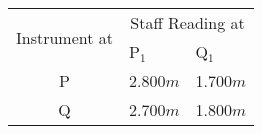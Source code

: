 \begin{tabular}{|c|p{3cm}|p{3cm}|}
    \hline
    \multirow{2}{*}{Instrument at} & \multicolumn{2}{|c|}{Staff Reading at}\\
    \cline{2-3}
    & P$_1$ & Q$_1$ \\
    \hline
    P & 2.800$m$ & 1.700$m$\\
    \hline
    Q & 2.700$m$ & 1.800$m$\\
    \hline
\end{tabular}